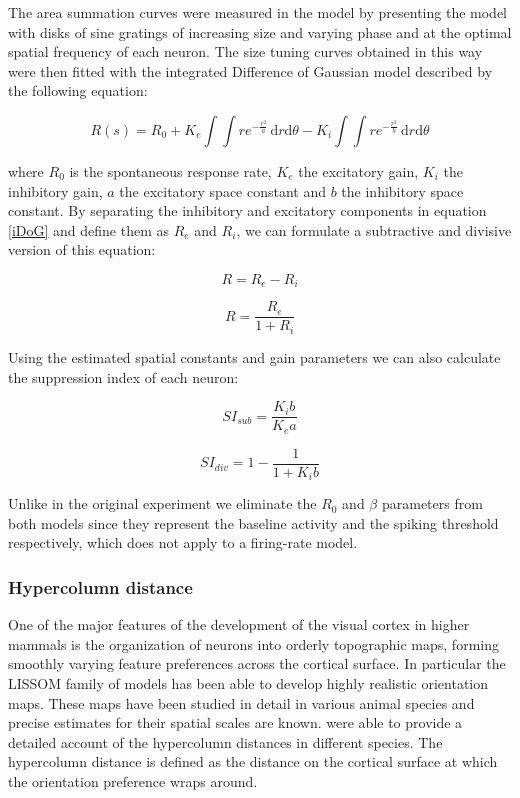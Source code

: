 The area summation curves were measured in the model by presenting the
model with disks of sine gratings of increasing size and varying phase
and at the optimal spatial frequency of each neuron. The size tuning
curves obtained in this way were then fitted with the integrated
Difference of Gaussian model described by the following equation:

\begin{equation}
R(s) = R_0 + K_e \int \int re^{-\frac{r^2}{a}} \,
\mathrm{d}r\mathrm{d}\theta - K_i \int\int re^{-\frac{r^2}{b}} \,
\mathrm{d}r\mathrm{d}\theta
\label{iDoG}
\end{equation}

\noindent where $R_0$ is the spontaneous response rate, $K_e$ the
excitatory gain, $K_i$ the inhibitory gain, $a$ the excitatory space
constant and $b$ the inhibitory space constant. By separating the
inhibitory and excitatory components in equation \ref{iDoG} and define
them as $R_e$ and $R_i$, we can formulate a subtractive and divisive
version of this equation:

\begin{equation}
R = R_e - R_i
\label{DoGSubstractive}
\end{equation}

\begin{equation}
R = \frac{R_e}{1+R_i}
\label{DoGDivisive}
\end{equation}

Using the estimated spatial constants and gain parameters we can also
calculate the suppression index of each neuron:

\begin{equation}
  SI_{sub} = \frac{K_i b}{K_e a}
\end{equation}

\begin{equation}
  SI_{div} = 1 - \frac{1}{1+K_i b}
\end{equation}

Unlike in the original experiment we eliminate the $R_0$ and $\beta$
parameters from both models since they represent the baseline activity
and the spiking threshold respectively, which does not apply to a
firing-rate model.

\subsubsection{Hypercolumn distance}

One of the major features of the development of the visual cortex in
higher mammals is the organization of neurons into orderly topographic
maps, forming smoothly varying feature preferences across the cortical
surface. In particular the LISSOM family of models has been able to
develop highly realistic orientation maps. These maps have been
studied in detail in various animal species and precise estimates for
their spatial scales are known. \cite{Kaschube2010} were able to
provide a detailed account of the hypercolumn distances in different
species. The hypercolumn distance is defined as the distance on the
cortical surface at which the orientation preference wraps around.

